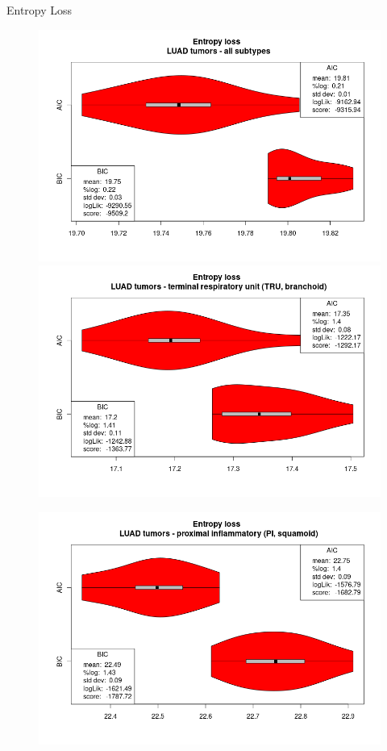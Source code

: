 \documentclass{beamer}
\begin{document}
\begin{frame}{Entropy Loss}
    \begin{figure}
        \centering
        \includegraphics[scale = 0.215]{img/vioplot_ALL.png}
        \includegraphics[scale = 0.215]{img/vioplot_TRU.png}
    \end{figure}
    \begin{figure}
        \centering
        \includegraphics[scale = 0.215]{img/vioplot_PI.png}

\end{figure}
\end{frame}
\end{document}
